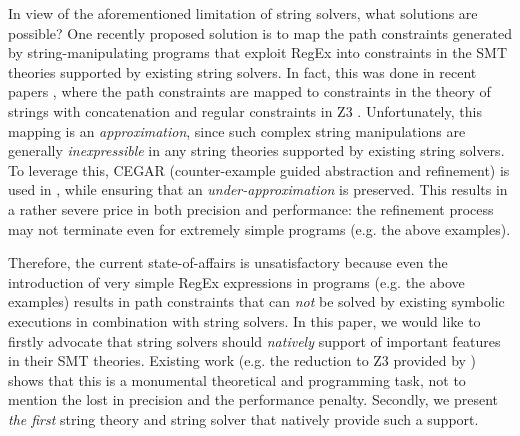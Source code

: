 In view of the aforementioned limitation of string solvers, what solutions are
possible? One recently proposed solution is to map the path constraints
generated by string-manipulating programs that exploit RegEx into constraints
in the SMT theories
supported by existing string solvers. In fact, this was done in recent papers
\cite{LMK19}, where the path constraints are mapped to constraints
in the theory of strings with concatenation and regular constraints in Z3 
\cite{Z3}. Unfortunately, this mapping is an \emph{approximation}, since
such complex string manipulations are generally \emph{inexpressible} in any 
string theories supported by existing string solvers.
%
To leverage this, CEGAR (counter-example guided 
abstraction and refinement) is used in \cite{LMK19}, while ensuring that an
\emph{under-approximation} is preserved. 
This results in a rather severe price in both precision and performance: the
refinement process may not terminate even for extremely simple programs
(e.g. the above examples). 

Therefore, the current state-of-affairs is unsatisfactory because even 
the introduction of very simple RegEx expressions in programs (e.g. the above 
examples) results in path constraints that can \emph{not} be solved by existing 
symbolic executions in combination with string solvers. In this paper, we would
like to firstly advocate that string solvers should \emph{natively} support of
important features \regexp{}
in their SMT theories. 
Existing work
(e.g. the reduction to Z3 provided by \cite{LMK19}) shows that this is a 
monumental theoretical and programming task, 
not to mention the lost in precision and the performance penalty. Secondly, we 
present \emph{the first} string
theory and string solver that natively provide such a support.


